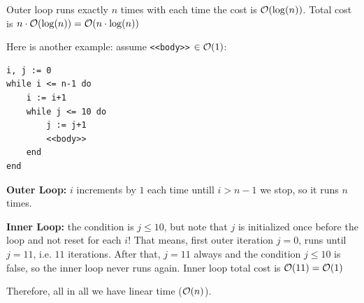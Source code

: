 Outer loop runs exactly $n$ times with each time the cost is $\mathcal{O}(\operatorname{log}(n))$. Total cost is $n \cdot \mathcal{O}(\operatorname{log}(n)) = \mathcal{O}(n \cdot \operatorname{log}(n))$

Here is another example: assume \texttt{<<body>>} $\in \mathcal{O}(1)$:
\begin{verbatim}
i, j := 0
while i <= n-1 do
    i := i+1
    while j <= 10 do
        j := j+1
        <<body>>
    end
end
\end{verbatim} 
\textbf{Outer Loop: }$i$ increments by $1$ each time untill $i > n - 1$ we stop, so it runs $n$ times.

\textbf{Inner Loop: }the condition is $j \leq 10$, but note that $j$ is initialized once before the loop and not reset for each $i$! That means, first outer iteration $j=0$, runs until $j = 11$, i.e. $11$ iterations. After that, $j=11$ always and the condition $j \leq 10$ is false, so the inner loop never runs again. Inner loop total cost is $\mathcal{O}(11) = \mathcal{O}(1)$

Therefore, all in all we have linear time ($\mathcal{O}(n)$).

